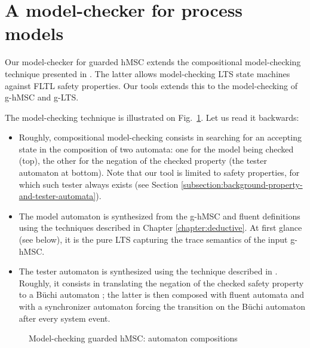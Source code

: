 \section{A model-checker for process models\label{section:tool-model-checker}}

Our model-checker for guarded hMSC extends the compositional model-checking technique presented in \cite{Giannakopoulou:2003}. The latter allows model-checking LTS state machines against FLTL safety properties. Our tools extends this to the model-checking of g-hMSC and g-LTS. 

The model-checking technique is illustrated on Fig.~\ref{image:model-checking-technique}. Let us read it backwards:
\begin{itemize}
\item Roughly, compositional model-checking consists in searching for an accepting state in the composition of two automata: one for the model being checked (top), the other for the negation of the checked property (the tester automaton at bottom). Note that our tool is limited to safety properties, for which such tester always exists (see Section \ref{subsection:background-property-and-tester-automata}).
\item The model automaton is synthesized from the g-hMSC and fluent definitions using the techniques described in Chapter \ref{chapter:deductive}. At first glance (see below), it is the pure LTS capturing the trace semantics of the input g-hMSC.
\item The tester automaton is synthesized using the technique described in \cite{Giannakopoulou:2003}. Roughly, it consists in translating the negation of the checked safety property to a B\"uchi automaton \cite{Giannakopoulou:2002}; the latter is then composed with fluent automata and with a synchronizer automaton forcing the transition on the B\"uchi automaton after every system event. 
\end{itemize} 

\begin{figure}
\centering{}
  \caption{Model-checking guarded hMSC: automaton compositions\label{image:model-checking-technique}}
\end{figure}

